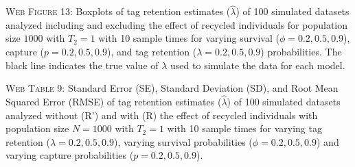 \documentclass[]{article}
\begin{document}
\textsc{Web Figure 13:} Boxplots of tag retention estimates
(\(\hat{\lambda}\)) of 100 simulated datasets analyzed including and excluding
the effect of recycled individuals for population size \(1000\) with
\(T_2=1\) with 10 sample times for varying survival
(\(\phi=0.2,0.5,0.9\)), capture (\(p=0.2,0.5,0.9\)), and tag retention
(\(\lambda=0.2,0.5,0.9\)) probabilities. The black line indicates the
true value of \(\lambda\) used to simulate the data for each model.

\textsc{Web Table 9:} Standard Error (SE), Standard Deviation (SD), and
Root Mean Squared Error (RMSE) of tag retention estimates
(\(\hat{\lambda}\)) of 100 simulated datasets analyzed without (R') and
with (R) the effect of recycled individuals with population size
\(N=1000\) with \(T_2=1\) with 10 sample times for varying tag retention
(\(\lambda=0.2,0.5,0.9\)), varying survival probabilities
(\(\phi=0.2,0.5,0.9\)) and varying capture probabilities
(\(p=0.2,0.5,0.9\)).
\end{document}
